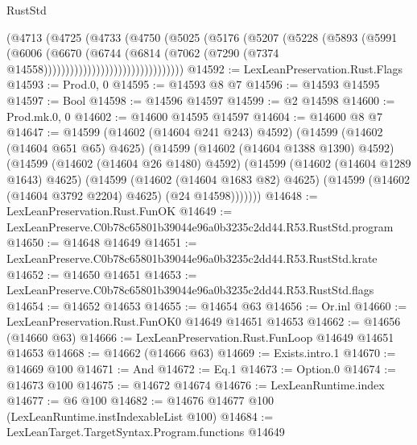 \begin{lexlean}{RustStd}
\begin{coremodule}
                                  (@4713
                                    (@4725
                                      (@4733
                                        (@4750
                                          (@5025
                                            (@5176
                                              (@5207
                                                (@5228
                                                  (@5893
                                                    (@5991
                                                      (@6006
                                                        (@6670
                                                          (@6744
                                                            (@6814
                                                              (@7062
                                                                (@7290
                                                                  (@7374
                                                                    @14558))))))))))))))))))))))))))))))))
@14592 := LexLeanPreservation.Rust.Flags
@14593 := Prod.{0, 0}
@14595 := @14593 @8 @7
@14596 := @14593 @14595
@14597 := Bool
@14598 := @14596 @14597
@14599 := @2 @14598
@14600 := Prod.mk.{0, 0}
@14602 := @14600 @14595 @14597
@14604 := @14600 @8 @7
@14647 := @14599
    (@14602 (@14604 @241 @243) @4592)
    (@14599
      (@14602 (@14604 @651 @65) @4625)
      (@14599
        (@14602 (@14604 @1388 @1390) @4592)
        (@14599
          (@14602 (@14604 @26 @1480) @4592)
          (@14599
            (@14602 (@14604 @1289 @1643) @4625)
            (@14599
              (@14602 (@14604 @1683 @82) @4625)
              (@14599 (@14602 (@14604 @3792 @2204) @4625) (@24 @14598)))))))
@14648 := LexLeanPreservation.Rust.FunOK
@14649 := LexLeanPreserve.C0b78c65801b39044e96a0b3235c2dd44.R53.RustStd.program
@14650 := @14648 @14649
@14651 := LexLeanPreserve.C0b78c65801b39044e96a0b3235c2dd44.R53.RustStd.krate
@14652 := @14650 @14651
@14653 := LexLeanPreserve.C0b78c65801b39044e96a0b3235c2dd44.R53.RustStd.flags
@14654 := @14652 @14653
@14655 := @14654 @63
@14656 := Or.inl
@14660 := LexLeanPreservation.Rust.FunOK0 @14649 @14651 @14653
@14662 := @14656 (@14660 @63)
@14666 := LexLeanPreservation.Rust.FunLoop @14649 @14651 @14653
@14668 := @14662 (@14666 @63)
@14669 := Exists.intro.{1}
@14670 := @14669 @100
@14671 := And
@14672 := Eq.{1}
@14673 := Option.{0}
@14674 := @14673 @100
@14675 := @14672 @14674
@14676 := LexLeanRuntime.index
@14677 := @6 @100
@14682 := @14676 @14677 @100 (LexLeanRuntime.instIndexableList @100)
@14684 := LexLeanTarget.TargetSyntax.Program.functions @14649

\end{coremodule}
\end{lexlean}
